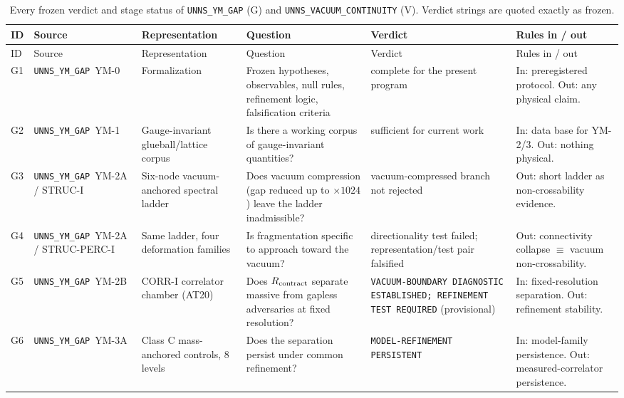 \documentclass[11pt,a4paper]{article}
\theoremstyle{definition}
\theoremstyle{remark}
\begin{document}
\begin{landscape}
{\footnotesize
\setlength{\tabcolsep}{4pt}
\begin{longtable}{@{}l>{\raggedright\arraybackslash}p{3.3cm}>{\raggedright\arraybackslash}p{3.8cm}>{\raggedright\arraybackslash}p{4.4cm}>{\raggedright\arraybackslash}p{4.6cm}>{\raggedright\arraybackslash}p{5.2cm}@{}}
\caption{Every frozen verdict and stage status of \texttt{UNNS\_YM\_GAP} (G) and \texttt{UNNS\_VACUUM\_CONTINUITY} (V). Verdict strings are quoted exactly as frozen.}\label{tab:verdicts}\\
\toprule ID & Source & Representation & Question & Verdict & Rules in / out\\\midrule\endfirsthead
\toprule ID & Source & Representation & Question & Verdict & Rules in / out\\\midrule\endhead
\bottomrule\endfoot
G1 & \texttt{UNNS\_YM\_GAP}\ YM-0 & Formalization & Frozen hypotheses, observables, null rules, refinement logic, falsification criteria & complete for the present program & In: preregistered protocol. Out: any physical claim.\\[3pt]
G2 & \texttt{UNNS\_YM\_GAP}\ YM-1 & Gauge-invariant glueball/lattice corpus & Is there a working corpus of gauge-invariant quantities? & sufficient for current work & In: data base for YM-2/3. Out: nothing physical.\\[3pt]
G3 & \texttt{UNNS\_YM\_GAP}\ YM-2A / STRUC-I & Six-node vacuum-anchored spectral ladder & Does vacuum compression (gap reduced up to $\times1024$) leave the ladder inadmissible? & vacuum-compressed branch not rejected & Out: short ladder as non-crossability evidence.\\[3pt]
G4 & \texttt{UNNS\_YM\_GAP}\ YM-2A / STRUC-PERC-I & Same ladder, four deformation families & Is fragmentation specific to approach toward the vacuum? & directionality test failed; representation/test pair falsified & Out: connectivity collapse $\equiv$ vacuum non-crossability.\\[3pt]
G5 & \texttt{UNNS\_YM\_GAP}\ YM-2B & CORR-I correlator chamber (AT20) & Does $R_{\rm contract}$ separate massive from gapless adversaries at fixed resolution? & \texttt{VACUUM-\allowbreak{}BOUNDARY DIAGNOSTIC ESTABLISHED; REFINEMENT TEST REQUIRED} (provisional) & In: fixed-resolution separation. Out: refinement stability.\\[3pt]
G6 & \texttt{UNNS\_YM\_GAP}\ YM-3A & Class C mass-anchored controls, 8 levels & Does the separation persist under common refinement? & \texttt{MODEL-\allowbreak{}REFINEMENT PERSISTENT} & In: model-family persistence. Out: measured-correlator persistence.\\[3pt]

\end{longtable}}
\end{landscape}
\end{document}
